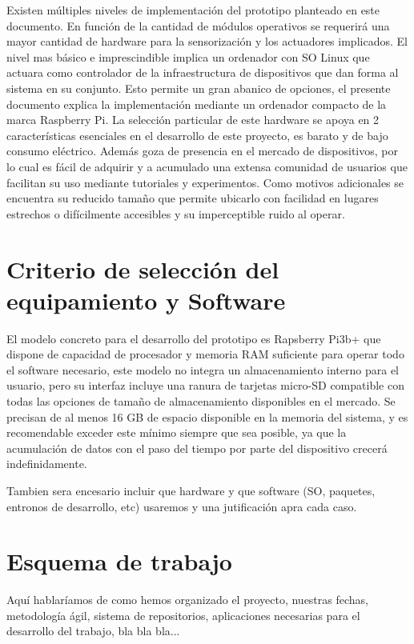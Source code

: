 Existen múltiples niveles de implementación del prototipo planteado en este documento. En función de la cantidad de módulos operativos se requerirá una mayor cantidad de hardware para la sensorización y los actuadores implicados. El nivel mas básico e imprescindible implica un ordenador con SO Linux que actuara como controlador de la infraestructura de dispositivos que dan forma al sistema en su conjunto. Esto permite un gran abanico de opciones, el presente documento explica la implementación mediante un ordenador compacto de la marca Raspberry Pi. La selección particular de este hardware se apoya en 2 características esenciales en el desarrollo de este proyecto, es barato y de bajo consumo eléctrico. Además goza de presencia en el mercado de dispositivos, por lo cual es fácil de adquirir y a acumulado una extensa comunidad de usuarios que facilitan su uso mediante tutoriales y experimentos. Como motivos adicionales se encuentra su reducido tamaño que permite ubicarlo con facilidad en lugares estrechos o difícilmente accesibles y su imperceptible ruido al operar.

\section{Criterio de selección del equipamiento y Software}
\label{makereference1.4}
El modelo concreto para el desarrollo del prototipo es Rapsberry Pi3b+ que dispone de capacidad de procesador y memoria RAM suficiente para operar todo el software necesario, este modelo no integra un almacenamiento interno para el usuario, pero su interfaz incluye una ranura de tarjetas micro-SD compatible con todas las opciones de tamaño de almacenamiento disponibles en el mercado. Se precisan de al menos 16 GB de espacio disponible en la memoria del sistema, y es recomendable exceder este mínimo siempre que sea posible, ya que la acumulación de datos con el paso del tiempo por parte del dispositivo crecerá indefinidamente.

Tambien sera encesario incluir que hardware y que software (SO, paquetes, entronos de desarrollo, etc) usaremos y una jutificación apra cada caso.


\section{Esquema de trabajo}
\label{makereference1.5}
Aquí hablaríamos de como hemos organizado el proyecto, nuestras fechas, metodología ágil, sistema de repositorios, aplicaciones necesarias para el desarrollo del trabajo, bla bla bla...

